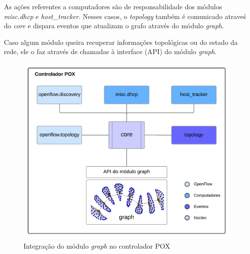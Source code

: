 As ações referentes a computadores são de responsabilidade dos módulos
\emph{misc.dhcp} e \emph{host\_tracker}.
Nesses casos, o \emph{topology} também é comunicado atraveś do \emph{core} e
dispara eventos que atualizam o grafo através do módulo \emph{graph}.

Caso algum módulo queira recuperar informações topológicas ou do estado da
rede, ele o faz através de chamadas à interface (API) do módulo \emph{graph}.

\begin{figure}[h!]
    \centering
    \label{fig:graph-integration}
    \includegraphics{img/graph-module-integration}
    \caption{Integração do módulo \emph{graph} no controlador POX}
\end{figure}

